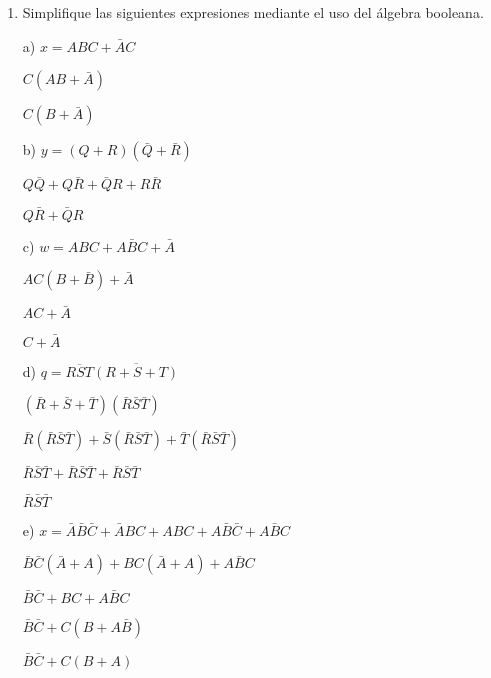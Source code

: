 \documentclass[a4paper, 12pt]{article}
\newcommand{\Aspace}{0.2cm}
\begin{document}
    \begin{enumerate}
        \item Simplifique las siguientes expresiones mediante el uso del álgebra booleana. \par
            \vspace{\Aspace} \par
            a) $x = ABC + \bar{A}C$
            \\ { \color{azul} 
                $C(AB + \bar{A})$
                \par $C(B + \bar{A})$
            }

            \vspace{\Aspace} \par
            b) $y = (Q + R)(\bar{Q} + \bar{R})$
            \\ { \color{azul} 
                $Q\bar{Q} + Q\bar{R} + \bar{Q}R + R\bar{R}$
                \par $Q\bar{R} + \bar{Q}R$
            }

            \vspace{\Aspace} \par
            c) $w = ABC + A\bar{B}C + \bar{A}$
            \\ { \color{azul} 
                $AC(B + \bar{B}) + \bar{A}$
                \par $AC + \bar{A}$
                \par $C + \bar{A}$
            }

            \vspace{\Aspace} \par
            d) $q = \overline{RST}\overline{(R + S + T)}$
            \\ { \color{azul} 
                $(\bar{R} + \bar{S} + \bar{T})(\bar{R}\bar{S}\bar{T})$
                \par $\bar{R}(\bar{R}\bar{S}\bar{T}) + \bar{S}(\bar{R}\bar{S}\bar{T}) + \bar{T}(\bar{R}\bar{S}\bar{T})$
                \par $\bar{R}\bar{S}\bar{T} + \bar{R}\bar{S}\bar{T} + \bar{R}\bar{S}\bar{T}$
                \par $\bar{R}\bar{S}\bar{T}$
            }

            \vspace{\Aspace} \par
            e) $x = \bar{A}\bar{B}\bar{C} + \bar{A}BC + ABC + A\bar{B}\bar{C} + A\bar{B}C$
            \\ { \color{azul} 
                $\bar{B}\bar{C}(\bar{A} + A) + BC(\bar{A} + A) + A\bar{B}C$
                \par $\bar{B}\bar{C} + BC + A\bar{B}C$
                \par $\bar{B}\bar{C} + C(B + A \bar{B})$
                \par $\bar{B}\bar{C} + C(B + A)$
            }


\end{enumerate}
\end{document}
